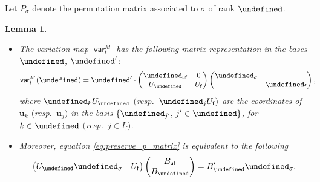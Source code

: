 \documentclass[10pt,a4paper]{amsart}
\newcommand{\opname}[1]{\operatorname{\mathsf{#1}}}
\newcommand{\uu}{{\underline{u}}}
\newcommand{\var}{\opname{var}}
\newcommand{\fv}{\opname{f}}
\newcommand{\ufv}{\opname{uf}}
\let\Iufv\undefined
\let\Ifv\undefined
\let\Id\undefined
\let\col\undefined
\let\trans\undefined
\let\ff\undefined
\let\uff\undefined
\let\low\undefined
\newcommand{\Iufv}{I_{\ufv}}
\newcommand{\Ifv}{I_{\fv}}
\newcommand{\Id}{{\opname{Id}}}
\newcommand{\col}{\opname{col}}
\newcommand{\trans}{\opname{P}}
\newcommand{\ff}{\mathbf{f}}
\renewcommand{\uu}{\mathbf{u}}
\newcommand{\uff}{\underline{\ff}}
\newcommand{\low}{\opname{\fv,\ufv}}
\numberwithin{equation}{section}
\newtheorem{Lemma}[Theorem]{Lemma}
\begin{document}
Let $P_{\sigma}$ denote the permutation matrix associated to $\sigma$
of rank $\Iufv$.

\begin{Lemma}\label{lem:matrix_eq_A_variation}\quad
\begin{itemize}\itemsep=0pt
\item[$(1)$] The variation map $\var_{t}^{M}$ has the following matrix representation
in the bases $\uff$, $\uff'$:
\begin{align*}%
\var_{t}^{M}(\uff) & =\uff'\cdot\begin{pmatrix}
\Id_{\ufv} & 0\\
U_{\low} & U_{\fv}
\end{pmatrix}\begin{pmatrix}
\trans_{\sigma}\\
 & \Id_{\fv}
\end{pmatrix},
\end{align*}
where $\col_{k}U_{\low}$ $($resp.\ $\col_{j}U_{\fv})$ are the coordinates of $\uu_{k}$ $($resp.\ $\uu_{j})$ in the basis $\{\ff_{j'},\,j'\in\Ifv\}$, for $k\in \Iufv $
$($resp.\ $j\in I_{\fv})$.

\item[$(2)$] Moreover, equation \eqref{eq:preserve_p_matrix} is equivalent
to the following
\begin{gather}
\begin{pmatrix}
U_{\low}\trans_{\sigma} & U_{\fv}\end{pmatrix}\begin{pmatrix}
B_{\ufv}\\
B_{\low}
\end{pmatrix} = B'_{\low}\trans_{\sigma}.\label{eq:solve_cluster_A_twist}
\end{gather}
\end{itemize}
\end{Lemma}
\end{document}
